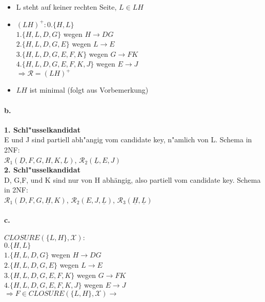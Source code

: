 \documentclass{article}
\begin{document}
		\begin{itemize}
			\item L steht auf keiner rechten Seite, $ L \in LH $ \checkmark
			\item $ (LH)^+: 0. \{H,L\} $\\
			$ 1. \{H,L,D,G\} $ \hspace*{23mm}wegen $ H \rightarrow DG $\\
			$ 2. \{H,L,D,G,E\} $ \hspace*{19mm}wegen $ L \rightarrow E $\\
			$ 3. \{H,L,D,G,E,F,K\} $ \hspace*{10mm}wegen $ G \rightarrow FK $\\
			$ 4. \{H,L,D,G,E,F,K,J\} $ \hspace*{7mm}wegen $ E \rightarrow J $\\
			$ \Rightarrow \mathcal{R} = (LH)^+ $ \checkmark
			\item $ LH $ ist minimal (folgt aus Vorbemerkung) \checkmark
		\end{itemize}	
	
	
		\paragraph*{b.}\textbf{1. Schl"usselkandidat}\\
		E und J sind partiell abh"angig vom candidate key, n"amlich von L. Schema in 2NF:\\
		$ \mathcal{R}_1(\underline{D},F,G,H,K,\underline{L}) $, $ \mathcal{R}_2(\underline{L},E,J) $\\[1.2em]
		
		\textbf{2. Schl"usselkandidat}\\
		D, G,F, und K sind nur von H abhängig, also partiell vom candidate key. Schema in 2NF:\\
		$ \mathcal{R}_1(D,F,G,\underline{H},K) $, $ \mathcal{R}_2(E,J,\underline{L}) $, $ \mathcal{R}_3(\underline{H},\underline{L}) $
		
		
		\paragraph*{c.}$ CLOSURE(\{L,H\}, \mathcal{X}):$\\
		$ 0. \{H,L\} $\\
		$ 1. \{H,L,D,G\} $ \hspace*{25mm}wegen $ H \rightarrow DG $\\
		$ 2. \{H,L,D,G,E\} $ \hspace*{21mm}wegen $ L \rightarrow E $\\
		$ 3. \{H,L,D,G,E,F,K\} $ \hspace*{13mm}wegen $ G \rightarrow FK $\\
		$ 4. \{H,L,D,G,E,F,K,J\} $ \hspace*{9mm}wegen $ E \rightarrow J $\\
		$ \Rightarrow F \in CLOSURE(\{L,H\}, \mathcal{X}) \rightarrow$ \checkmark
	\pagebreak
	
\end{document}
